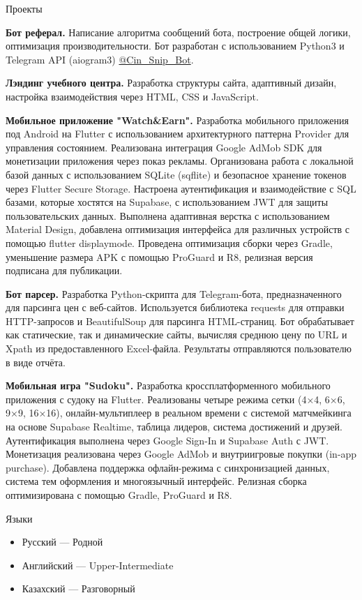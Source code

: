 \documentclass{resume} %
\begin{document}
\begin{rSection}{Проекты}
\item \textbf{Бот реферал.} {Написание алгоритма сообщений бота, построение общей логики, оптимизация производительности. Бот разработан с использованием Python3 и Telegram API (aiogram3) \href{https://t.me/Cin_Snip_Bot}{@Cin\_Snip\_Bot}.}
\item \textbf{Лэндинг учебного центра.} {Разработка структуры сайта, адаптивный дизайн, настройка взаимодействия через HTML, CSS и JavaScript.}
\item \textbf{Мобильное приложение "Watch\&Earn".} {Разработка мобильного приложения под Android на Flutter с использованием архитектурного паттерна Provider для управления состоянием. Реализована интеграция Google AdMob SDK для монетизации приложения через показ рекламы. Организована работа с локальной базой данных с использованием SQLite (sqflite) и безопасное хранение токенов через Flutter Secure Storage. Настроена аутентификация и взаимодействие с SQL базами, которые хостятся на Supabase, с использованием JWT для защиты пользовательских данных. Выполнена адаптивная верстка с использованием Material Design, добавлена оптимизация интерфейса для различных устройств с помощью flutter displaymode. Проведена оптимизация сборки через Gradle, уменьшение размера APK с помощью ProGuard и R8, релизная версия подписана для публикации.}
\item \textbf{Бот парсер.} {Разработка Python-скрипта для Telegram-бота, предназначенного для парсинга цен с веб-сайтов. Используется библиотека requests для отправки HTTP-запросов и BeautifulSoup для парсинга HTML-страниц. Бот обрабатывает как статические, так и динамические сайты, вычисляя среднюю цену по URL и Xpath из предоставленного Excel-файла. Результаты отправляются пользователю в виде отчёта.}
\item \textbf{Мобильная игра "Sudoku".} {Разработка кроссплатформенного мобильного приложения с судоку на Flutter. Реализованы четыре режима сетки (4×4, 6×6, 9×9, 16×16), онлайн-мультиплеер в реальном времени с системой матчмейкинга на основе Supabase Realtime, таблица лидеров, система достижений и друзей. Аутентификация выполнена через Google Sign-In и Supabase Auth с JWT. Монетизация реализована через Google AdMob и внутриигровые покупки (in-app purchase). Добавлена поддержка офлайн-режима с синхронизацией данных, система тем оформления и многоязычный интерфейс. Релизная сборка оптимизирована с помощью Gradle, ProGuard и R8.}
\end{rSection}

\begin{rSection}{Языки}
\begin{itemize}
    \item Русский --- Родной
    \item Английский --- Upper-Intermediate
    \item Казахский --- Разговорный
\end{itemize}
\end{rSection}
\end{document}
